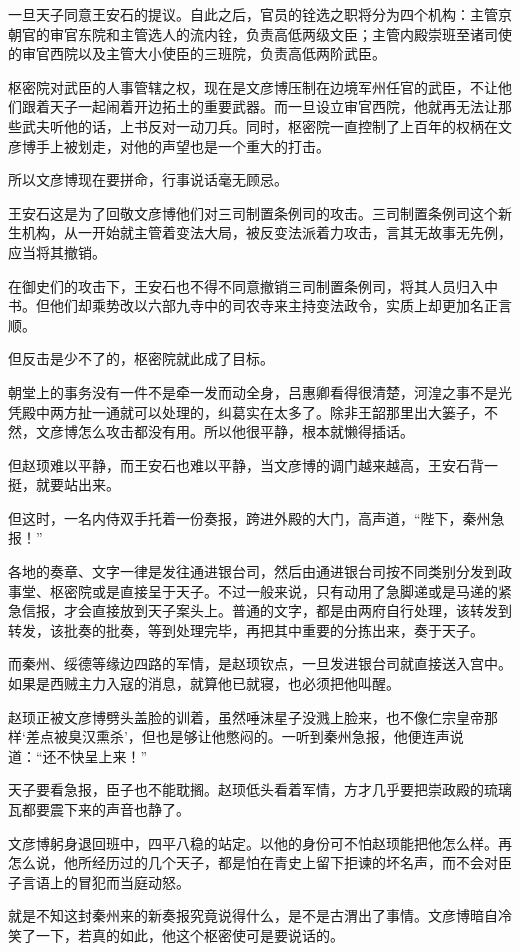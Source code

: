 一旦天子同意王安石的提议。自此之后，官员的铨选之职将分为四个机构：主管京朝官的审官东院和主管选人的流内铨，负责高低两级文臣；主管内殿崇班至诸司使的审官西院以及主管大小使臣的三班院，负责高低两阶武臣。

枢密院对武臣的人事管辖之权，现在是文彦博压制在边境军州任官的武臣，不让他们跟着天子一起闹着开边拓土的重要武器。而一旦设立审官西院，他就再无法让那些武夫听他的话，上书反对一动刀兵。同时，枢密院一直控制了上百年的权柄在文彦博手上被划走，对他的声望也是一个重大的打击。

所以文彦博现在要拼命，行事说话毫无顾忌。

王安石这是为了回敬文彦博他们对三司制置条例司的攻击。三司制置条例司这个新生机构，从一开始就主管着变法大局，被反变法派着力攻击，言其无故事无先例，应当将其撤销。

在御史们的攻击下，王安石也不得不同意撤销三司制置条例司，将其人员归入中书。但他们却乘势改以六部九寺中的司农寺来主持变法政令，实质上却更加名正言顺。

但反击是少不了的，枢密院就此成了目标。

朝堂上的事务没有一件不是牵一发而动全身，吕惠卿看得很清楚，河湟之事不是光凭殿中两方扯一通就可以处理的，纠葛实在太多了。除非王韶那里出大篓子，不然，文彦博怎么攻击都没有用。所以他很平静，根本就懒得插话。

但赵顼难以平静，而王安石也难以平静，当文彦博的调门越来越高，王安石背一挺，就要站出来。

但这时，一名内侍双手托着一份奏报，跨进外殿的大门，高声道，“陛下，秦州急报！”

各地的奏章、文字一律是发往通进银台司，然后由通进银台司按不同类别分发到政事堂、枢密院或是直接呈于天子。不过一般来说，只有动用了急脚递或是马递的紧急信报，才会直接放到天子案头上。普通的文字，都是由两府自行处理，该转发到转发，该批奏的批奏，等到处理完毕，再把其中重要的分拣出来，奏于天子。

而秦州、绥德等缘边四路的军情，是赵顼钦点，一旦发进银台司就直接送入宫中。如果是西贼主力入寇的消息，就算他已就寝，也必须把他叫醒。

赵顼正被文彦博劈头盖脸的训着，虽然唾沫星子没溅上脸来，也不像仁宗皇帝那样‘差点被臭汉熏杀’，但也是够让他憋闷的。一听到秦州急报，他便连声说道：“还不快呈上来！”

天子要看急报，臣子也不能耽搁。赵顼低头看着军情，方才几乎要把崇政殿的琉璃瓦都要震下来的声音也静了。

文彦博躬身退回班中，四平八稳的站定。以他的身份可不怕赵顼能把他怎么样。再怎么说，他所经历过的几个天子，都是怕在青史上留下拒谏的坏名声，而不会对臣子言语上的冒犯而当庭动怒。

就是不知这封秦州来的新奏报究竟说得什么，是不是古渭出了事情。文彦博暗自冷笑了一下，若真的如此，他这个枢密使可是要说话的。

